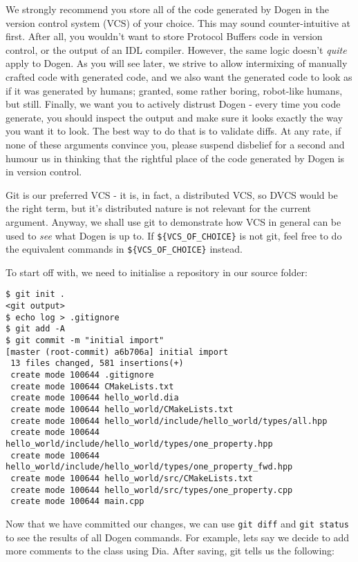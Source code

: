 \documentclass[11pt]{article}
\begin{document}
We strongly recommend you store all of the code generated by Dogen in
the version control system (VCS) of your choice. This may sound
counter-intuitive at first. After all, you wouldn't want to store
Protocol Buffers code in version control, or the output of an IDL
compiler. However, the same logic doesn't \emph{quite} apply to Dogen. As
you will see later, we strive to allow intermixing of manually crafted
code with generated code, and we also want the generated code to look
as if it was generated by humans; granted, some rather boring,
robot-like humans, but still. Finally, we want you to actively
distrust Dogen - every time you code generate, you should inspect the
output and make sure it looks exactly the way you want it to look. The
best way to do that is to validate diffs. At any rate, if none of
these arguments convince you, please suspend disbelief for a second
and humour us in thinking that the rightful place of the code
generated by Dogen is in version control.

Git is our preferred VCS - it is, in fact, a distributed VCS, so DVCS
would be the right term, but it's distributed nature is not relevant
for the current argument. Anyway, we shall use git to demonstrate how
VCS in general can be used to \emph{see} what Dogen is up to. If
\texttt{\$\{VCS\_OF\_CHOICE\}} is not git, feel free to do the equivalent commands
in \texttt{\$\{VCS\_OF\_CHOICE\}} instead.

To start off with, we need to initialise a repository in our source
folder:

\begin{verbatim}
$ git init .
<git output>
$ echo log > .gitignore
$ git add -A
$ git commit -m "initial import"
[master (root-commit) a6b706a] initial import
 13 files changed, 581 insertions(+)
 create mode 100644 .gitignore
 create mode 100644 CMakeLists.txt
 create mode 100644 hello_world.dia
 create mode 100644 hello_world/CMakeLists.txt
 create mode 100644 hello_world/include/hello_world/types/all.hpp
 create mode 100644 hello_world/include/hello_world/types/one_property.hpp
 create mode 100644 hello_world/include/hello_world/types/one_property_fwd.hpp
 create mode 100644 hello_world/src/CMakeLists.txt
 create mode 100644 hello_world/src/types/one_property.cpp
 create mode 100644 main.cpp
\end{verbatim}

Now that we have committed our changes, we can use \texttt{git diff} and \texttt{git
status} to see the results of all Dogen commands. For example, lets
say we decide to add more comments to the class using Dia. After
saving, git tells us the following:
\end{document}

